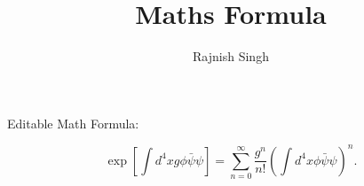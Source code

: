 \documentclass{article}
\title{Maths Formula}
\author{Rajnish Singh}
\begin{document}
        \maketitle

        Editable Math Formula:

        \[
        \exp\left[\int d^{4}x g\phi\bar{\psi}\psi\right]=\sum_{n=0}^{\infty}\frac{g^{n}}{n!}\left(\int d^{4}x\phi\bar{\psi}\psi\right)^{n}.
        \]

        
\end{document}
